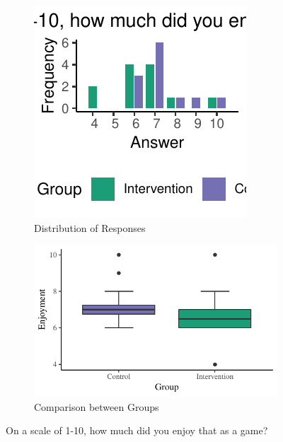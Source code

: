 \documentclass[12pt,a4paper]{article}\usepackage[]{graphicx}\usepackage[]{color}
\makeatletter
\def\maxwidth{ %
  \ifdim\Gin@nat@width>\linewidth
    \linewidth
  \else
    \Gin@nat@width
  \fi
}
\makeatother
\begin{document}
\begin{figure}[htb]
	\centering
	\begin{subfigure}[t]{.49\linewidth}


{\centering \includegraphics[width=\maxwidth]{figure/ParticipantEnjoyment-1} 

}



		\caption{Distribution of Responses}
	\end{subfigure}
	\begin{subfigure}[t]{.49\linewidth}


{\centering \includegraphics[width=\maxwidth]{figure/ParticipantEnjoymentBoxPlot-1} 

}



		\caption{Comparison between Groups}
	\end{subfigure}
	\caption{On a scale of 1-10, how much did you enjoy that as a game?}
	\label{fig:ParticipantEnjoyment}
\end{figure}
\end{document}
